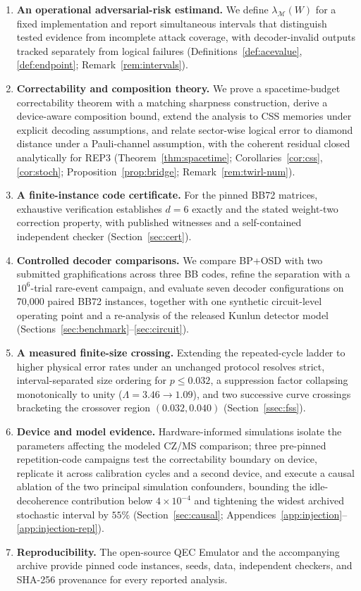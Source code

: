 \documentclass[pdflatex,sn-mathphys-num]{sn-jnl}
\theoremstyle{thmstyleone}
\theoremstyle{thmstyletwo}
\theoremstyle{thmstylethree}
\begin{document}
\begin{enumerate}[leftmargin=1.6em,label=(\roman*)]
  \item \textbf{An operational adversarial-risk estimand.} We define $\lambda_{\mathcal{M}}(W)$ for a fixed implementation and report simultaneous intervals that distinguish tested evidence from incomplete attack coverage, with decoder-invalid outputs tracked separately from logical failures (Definitions~\ref{def:acevalue}, \ref{def:endpoint}; Remark~\ref{rem:intervals}).
  \item \textbf{Correctability and composition theory.} We prove a spacetime-budget correctability theorem with a matching sharpness construction, derive a device-aware composition bound, extend the analysis to CSS memories under explicit decoding assumptions, and relate sector-wise logical error to diamond distance under a Pauli-channel assumption, with the coherent residual closed analytically for REP3 (Theorem~\ref{thm:spacetime}; Corollaries~\ref{cor:css}, \ref{cor:stoch}; Proposition~\ref{prop:bridge}; Remark~\ref{rem:twirl-num}).
  \item \textbf{A finite-instance code certificate.} For the pinned BB72 matrices, exhaustive verification establishes $d=6$ exactly and the stated weight-two correction property, with published witnesses and a self-contained independent checker (Section~\ref{sec:cert}).
  \item \textbf{Controlled decoder comparisons.} We compare BP+OSD with two submitted graphifications across three BB codes, refine the separation with a $10^{6}$-trial rare-event campaign, and evaluate seven decoder configurations on 70{,}000 paired BB72 instances, together with one synthetic circuit-level operating point and a re-analysis of the released Kunlun detector model (Sections~\ref{sec:benchmark}--\ref{sec:circuit}).
  \item \textbf{A measured finite-size crossing.} Extending the repeated-cycle ladder to higher physical error rates under an unchanged protocol resolves strict, interval-separated size ordering for $p\le0.032$, a suppression factor collapsing monotonically to unity ($\Lambda=3.46\to1.09$), and two successive curve crossings bracketing the crossover region $(0.032,0.040)$ (Section~\ref{ssec:fss}).
  \item \textbf{Device and model evidence.} Hardware-informed simulations isolate the parameters affecting the modeled CZ/MS comparison; three pre-pinned repetition-code campaigns test the correctability boundary on device, replicate it across calibration cycles and a second device, and execute a causal ablation of the two principal simulation confounders, bounding the idle-decoherence contribution below $4\times10^{-4}$ and tightening the widest archived stochastic interval by $55\%$ (Section~\ref{sec:causal}; Appendices~\ref{app:injection}--\ref{app:injection-repl}).
  \item \textbf{Reproducibility.} The open-source QEC Emulator and the accompanying archive provide pinned code instances, seeds, data, independent checkers, and SHA-256 provenance for every reported analysis.
\end{enumerate}
\end{document}
